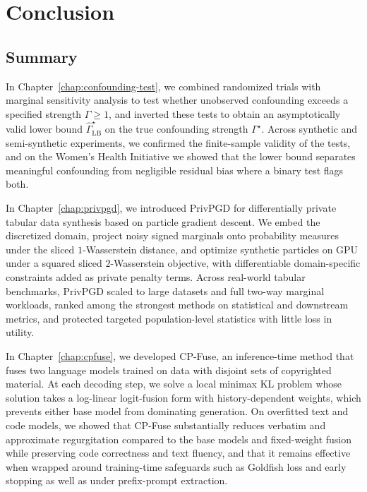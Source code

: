 \chapter{Conclusion}
\label{chap:conclusion}

\section{Summary}

In Chapter~\ref{chap:confounding-test}, we combined randomized trials with marginal sensitivity analysis to test whether unobserved confounding exceeds a specified strength \(\Gamma \ge 1\), and inverted these tests to obtain an asymptotically valid lower bound \(\widehat{\Gamma}_{\mathrm{LB}}^{\star}\) on the true confounding strength \(\Gamma^{\star}\). Across synthetic and semi-synthetic experiments, we confirmed the finite-sample validity of the tests, and on the Women's Health Initiative we showed that the lower bound separates meaningful confounding from negligible residual bias where a binary test flags both.

In Chapter~\ref{chap:privpgd}, we introduced PrivPGD for differentially private tabular data synthesis based on particle gradient descent. We embed the discretized domain, project noisy signed marginals onto probability measures under the sliced \(1\)-Wasserstein distance, and optimize synthetic particles on GPU under a squared sliced \(2\)-Wasserstein objective, with differentiable domain-specific constraints added as private penalty terms. Across real-world tabular benchmarks, PrivPGD scaled to large datasets and full two-way marginal workloads, ranked among the strongest methods on statistical and downstream metrics, and protected targeted population-level statistics with little loss in utility.

In Chapter~\ref{chap:cpfuse}, we developed CP-Fuse, an inference-time method that fuses two language models trained on data with disjoint sets of copyrighted material. At each decoding step, we solve a local minimax KL problem whose solution takes a log-linear logit-fusion form with history-dependent weights, which prevents either base model from dominating generation. On overfitted text and code models, we showed that CP-Fuse substantially reduces verbatim and approximate regurgitation compared to the base models and fixed-weight fusion while preserving code correctness and text fluency, and that it remains effective when wrapped around training-time safeguards such as Goldfish loss and early stopping as well as under prefix-prompt extraction.

